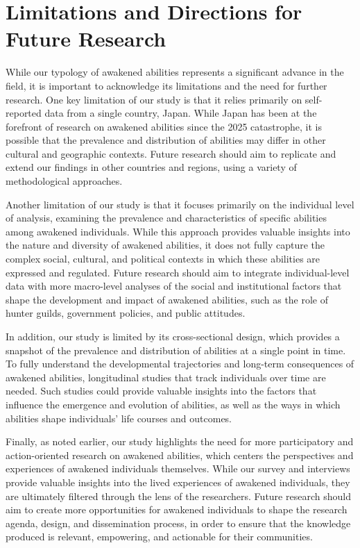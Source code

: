 \documentclass[12pt]{article}
\begin{document}
\section{Limitations and Directions for Future Research}
While our typology of awakened abilities represents a significant advance in the field, it is important to acknowledge its limitations and the need for further research. One key limitation of our study is that it relies primarily on self-reported data from a single country, Japan. While Japan has been at the forefront of research on awakened abilities since the 2025 catastrophe, it is possible that the prevalence and distribution of abilities may differ in other cultural and geographic contexts. Future research should aim to replicate and extend our findings in other countries and regions, using a variety of methodological approaches.

Another limitation of our study is that it focuses primarily on the individual level of analysis, examining the prevalence and characteristics of specific abilities among awakened individuals. While this approach provides valuable insights into the nature and diversity of awakened abilities, it does not fully capture the complex social, cultural, and political contexts in which these abilities are expressed and regulated. Future research should aim to integrate individual-level data with more macro-level analyses of the social and institutional factors that shape the development and impact of awakened abilities, such as the role of hunter guilds, government policies, and public attitudes.

In addition, our study is limited by its cross-sectional design, which provides a snapshot of the prevalence and distribution of abilities at a single point in time. To fully understand the developmental trajectories and long-term consequences of awakened abilities, longitudinal studies that track individuals over time are needed. Such studies could provide valuable insights into the factors that influence the emergence and evolution of abilities, as well as the ways in which abilities shape individuals' life courses and outcomes.

Finally, as noted earlier, our study highlights the need for more participatory and action-oriented research on awakened abilities, which centers the perspectives and experiences of awakened individuals themselves. While our survey and interviews provide valuable insights into the lived experiences of awakened individuals, they are ultimately filtered through the lens of the researchers. Future research should aim to create more opportunities for awakened individuals to shape the research agenda, design, and dissemination process, in order to ensure that the knowledge produced is relevant, empowering, and actionable for their communities.
\end{document}

